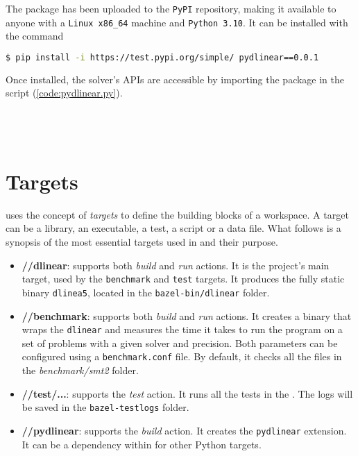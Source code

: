 The package has been uploaded to the \texttt{PyPI} repository, making it available to anyone with a \texttt{Linux x86\_64} machine and \texttt{Python 3.10}.
It can be installed with the command

\begin{lstlisting}[language=bash,frame=single,showstringspaces=false]
$ pip install -i https://test.pypi.org/simple/ pydlinear==0.0.1
\end{lstlisting}
Once installed, the solver's APIs are accessible by importing the \pydlinear package in the script (\autoref{code:pydlinear.py}). \\ \\ \\ \\



\section{Targets}

\bazel uses the concept of \textit{targets} to define the building blocks of a workspace.
A target can be a library, an executable, a test, a script or a data file.
What follows is a synopsis of the most essential targets used in \dlinear and their purpose.

\begin{itemize}
        \item \textbf{//dlinear}: supports both \textit{build} and \textit{run} actions.
              It is the project's main target, used by the \texttt{benchmark} and \texttt{test} targets.
              It produces the fully static binary \texttt{dlinea5}, located in the \texttt{bazel-bin/dlinear} folder.
        \item \textbf{//benchmark}: supports both \textit{build} and \textit{run} actions.
              It creates a binary that wraps the \texttt{dlinear} and measures the time it takes to run the program on a set of problems with a given solver and precision.
              Both parameters can be configured using a \texttt{benchmark.conf} file.
              By default, it checks all the files in the \textit{benchmark/smt2} folder.
        \item \textbf{//test/...}: supports the \textit{test} action.
              It runs all the tests in the \dlinear.
              The logs will be saved in the \texttt{bazel-testlogs} folder.
        \item \textbf{//pydlinear}: supports the \textit{build} action.
              It creates the \texttt{pydlinear} extension.
              It can be a dependency within \bazel for other Python targets.
\end{itemize}
